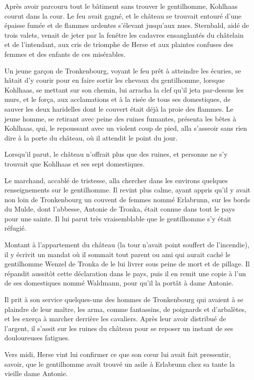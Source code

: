 \documentclass[french,twoside]{book} %
\begin{document}
Après avoir parcouru tout le bâtiment sans trouver le gentilhomme, Kohlhaas courut dans la cour. Le feu avait gagné, et le château se trouvait entouré d’une épaisse fumée et de flammes ardentes s’élevant jusqu’aux nues. Sternbald, aidé de trois valets, venait de jeter par la fenêtre les cadavres ensanglantés du châtelain et de l’intendant, aux cris de triomphe de Herse et aux plaintes confuses des femmes et des enfants de ces misérables.\par
Un jeune garçon de Tronkenbourg, voyant le feu prêt à atteindre les écuries, se hâtait d’y courir pour en faire sortir les chevaux du gentilhomme, lorsque Kohlhaas, se mettant sur son chemin, lui arracha la clef qu’il jeta par-dessus les murs, et le força, aux acclamations et à la risée de tous ses domestiques, de sauver les deux haridelles dont le couvert était déjà la proie des flammes. Le jeune homme, se retirant avec peine des ruines fumantes, présenta les bêtes à Kohlhaas, qui, le repoussant avec un violent coup de pied, alla s’asseoir sans rien dire à la porte du château, où il attendit le point du jour.\par
Lorsqu’il parut, le château n’offrait plus que des ruines, et personne ne s’y trouvait que Kohlhaas et ses sept domestiques.\par
Le marchand, accablé de tristesse, alla chercher dans les environs quelques renseignements sur le gentilhomme. Il revint plus calme, ayant appris qu’il y avait non loin de Tronkenbourg un couvent de femmes nommé Erlabrunn, sur les bords du Mulde, dont l’abbesse, Antonie de Tronka, était connue dans tout le pays pour une sainte. Il lui parut très vraisemblable que le gentilhomme s’y était réfugié.\par
Montant à l’appartement du château (la tour n’avait point souffert de l’incendie), il y écrivit un mandat où il sommait tout parent ou ami qui aurait caché le gentilhomme Wenzel de Tronka de le lui livrer sous peine de mort et de pillage. Il répandit aussitôt cette déclaration dans le pays, puis il en remit une copie à l’un de ses domestiques nommé Waldmann, pour qu’il la portât à dame Antonie.\par
Il prit à son service quelques-uns des hommes de Tronkenbourg qui avaient à se plaindre de leur maître, les arma, comme fantassins, de poignards et d’arbalètes, et les exerça à marcher derrière les cavaliers. Après leur avoir distribué de l’argent, il s’assit sur les ruines du château pour se reposer un instant de ses douloureuses fatigues.\par
Vers midi, Herse vint lui confirmer ce que son cœur lui avait fait pressentir, savoir, que le gentilhomme avait trouvé un asile à Erlabrunn chez sa tante la vieille dame Antonie.\par
\end{document}
